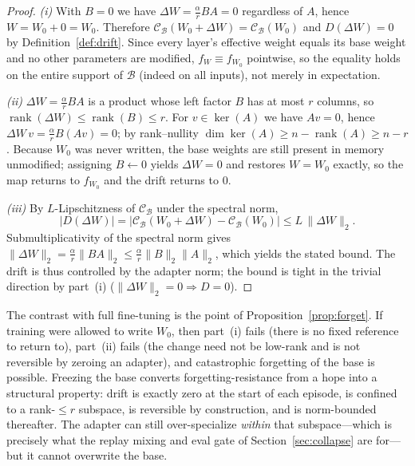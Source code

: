 \documentclass[11pt]{article}
\begin{document}
\begin{proof}
\emph{(i)} With $B=0$ we have $\Delta W = \tfrac{\alpha}{r} BA = 0$ regardless of $A$, hence $W = W_0 + 0 = W_0$. Therefore $\mathcal{C}_{\mathcal{B}}(W_0+\Delta W) = \mathcal{C}_{\mathcal{B}}(W_0)$ and $D(\Delta W) = 0$ by Definition~\ref{def:drift}. Since every layer's effective weight equals its base weight and no other parameters are modified, $f_W \equiv f_{W_0}$ pointwise, so the equality holds on the entire support of $\mathcal{B}$ (indeed on all inputs), not merely in expectation.

\emph{(ii)} $\Delta W = \tfrac{\alpha}{r}BA$ is a product whose left factor $B$ has at most $r$ columns, so $\operatorname{rank}(\Delta W) \le \operatorname{rank}(B) \le r$. For $v \in \ker(A)$ we have $Av = 0$, hence $\Delta W\,v = \tfrac{\alpha}{r}B(Av) = 0$; by rank–nullity $\dim\ker(A) \ge n - \operatorname{rank}(A) \ge n - r$. Because $W_0$ was never written, the base weights are still present in memory unmodified; assigning $B \leftarrow 0$ yields $\Delta W = 0$ and restores $W = W_0$ exactly, so the map returns to $f_{W_0}$ and the drift returns to $0$.

\emph{(iii)} By $L$-Lipschitzness of $\mathcal{C}_{\mathcal{B}}$ under the spectral norm,
\[
|D(\Delta W)| = \big|\mathcal{C}_{\mathcal{B}}(W_0+\Delta W) - \mathcal{C}_{\mathcal{B}}(W_0)\big| \le L\,\|\Delta W\|_2 .
\]
Submultiplicativity of the spectral norm gives $\|\Delta W\|_2 = \tfrac{\alpha}{r}\|BA\|_2 \le \tfrac{\alpha}{r}\|B\|_2\|A\|_2$, which yields the stated bound. The drift is thus controlled by the adapter norm; the bound is tight in the trivial direction by part~(i) ($\|\Delta W\|_2=0 \Rightarrow D=0$).
\end{proof}

The contrast with full fine-tuning is the point of Proposition~\ref{prop:forget}. If training were allowed to write $W_0$, then part~(i) fails (there is no fixed reference to return to), part~(ii) fails (the change need not be low-rank and is not reversible by zeroing an adapter), and catastrophic forgetting of the base is possible. Freezing the base converts forgetting-resistance from a hope into a structural property: drift is exactly zero at the start of each episode, is confined to a rank-$\le r$ subspace, is reversible by construction, and is norm-bounded thereafter. The adapter can still over-specialize \emph{within} that subspace---which is precisely what the replay mixing and eval gate of Section~\ref{sec:collapse} are for---but it cannot overwrite the base.
\end{document}
